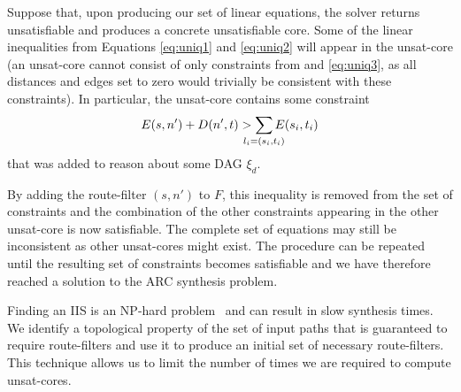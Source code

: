 Suppose that, upon producing our set of linear equations, the solver returns unsatisfiable and produces
a concrete unsatisfiable core. 
Some of the linear inequalities from 
Equations \eqref{eq:uniq1} and  \eqref{eq:uniq2}
will appear in the unsat-core 
(an unsat-core cannot consist of only 
constraints from  and \eqref{eq:uniq3}, as all distances and edges set to zero
would trivially be consistent with these constraints). 
In particular, the unsat-core contains some constraint
\begin{eqnarray}
E(s, n') + D(n', t) > \sum_{\mathclap{\substack{l_i=(s_i,t_i)}}} 
		E(s_i, t_i) 
\end{eqnarray}
that was added to reason about some DAG $\xi_d$.

By adding the route-filter $(s,n')$ to $F$, this inequality is removed from the set of constraints
and the combination of the other constraints appearing in the other unsat-core is now satisfiable.
The complete set of equations may still be inconsistent as other unsat-cores might exist. 
The procedure can be repeated until the resulting set of constraints becomes satisfiable
and we have therefore reached a solution to the ARC synthesis problem.


Finding an IIS is an NP-hard problem~\cite{iiscomplexity}
and can result in slow synthesis times.
We identify a topological property of the set of input paths that 
is guaranteed to require route-filters and use it to produce an initial set of necessary route-filters.
This technique allows us to limit the number of times we are required to compute  unsat-cores.

